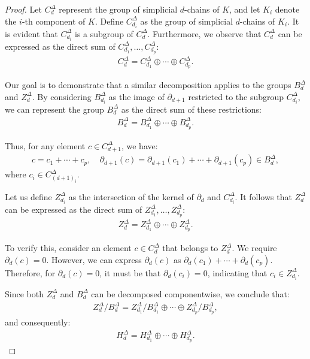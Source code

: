 \begin{proof}
Let \( C^{\Delta}_{d} \) represent the group of simplicial \( d \)-chains of \( K \), and let \( K_{i} \) denote the \( i \)-th component of \( K \). Define \( C^{\Delta}_{d_i} \) as the group of simplicial \( d \)-chains of \( K_{i} \). It is evident that \( C^{\Delta}_{d_i} \) is a subgroup of \( C^{\Delta}_{d} \). Furthermore, we observe that \( C^{\Delta}_{d} \) can be expressed as the direct sum of \( C^{\Delta}_{d_1}, \ldots, C^{\Delta}_{d_p} \):
\begin{align}
C^{\Delta}_{d} = C^{\Delta}_{d_1} \oplus \cdots \oplus C^{\Delta}_{d_p}.
\end{align}

Our goal is to demonstrate that a similar decomposition applies to the groups \( B^{\Delta}_{d} \) and \( Z^{\Delta}_{d} \). By considering \( B^{\Delta}_{d_i} \) as the image of \( \partial_{d+1} \) restricted to the subgroup \( C^{\Delta}_{d_i} \), we can represent the group \( B^{\Delta}_{d} \) as the direct sum of these restrictions:
\begin{align}
B^{\Delta}_{d} = B^{\Delta}_{d_1} \oplus \cdots \oplus B^{\Delta}_{d_p}.
\end{align}

Thus, for any element \( c \in C^{\Delta}_{d+1} \), we have:
\begin{align}
c = c_{1} + \cdots + c_{p}, \quad \partial_{d+1}(c) = \partial_{d+1}(c_{1}) + \cdots + \partial_{d+1}(c_{p}) \in B^{\Delta}_{d},
\end{align}
where \( c_{i} \in C^{\Delta}_{(d+1)_i} \).

Let us define \( Z^{\Delta}_{d_i} \) as the intersection of the kernel of \( \partial_{d} \) and \( C^{\Delta}_{d_i} \). It follows that \( Z^{\Delta}_{d} \) can be expressed as the direct sum of \( Z^{\Delta}_{d_1}, \ldots, Z^{\Delta}_{d_p} \):
\begin{align}
Z^{\Delta}_{d} = Z^{\Delta}_{d_1} \oplus \cdots \oplus Z^{\Delta}_{d_p}.
\end{align}

To verify this, consider an element \( c \in C^{\Delta}_{d} \) that belongs to \( Z^{\Delta}_{d} \). We require \( \partial_{d}(c) = 0 \). However, we can express \( \partial_{d}(c) \) as \( \partial_{d}(c_{1}) + \cdots + \partial_{d}(c_{p}) \). Therefore, for \( \partial_{d}(c) = 0 \), it must be that \( \partial_{d}(c_{i}) = 0 \), indicating that \( c_{i} \in Z^{\Delta}_{d_i} \).

Since both \( Z^{\Delta}_{d} \) and \( B^{\Delta}_{d} \) can be decomposed componentwise, we conclude that:
\begin{align}
Z^{\Delta}_{d} / B^{\Delta}_{d} = Z^{\Delta}_{d_1} / B^{\Delta}_{d_1} \oplus \cdots \oplus Z^{\Delta}_{d_p} / B^{\Delta}_{d_p},
\end{align}
and consequently:
\begin{align}
H^{\Delta}_{d} = H^{\Delta}_{d_1} \oplus \cdots \oplus H^{\Delta}_{d_p}.
\end{align}
\end{proof}

